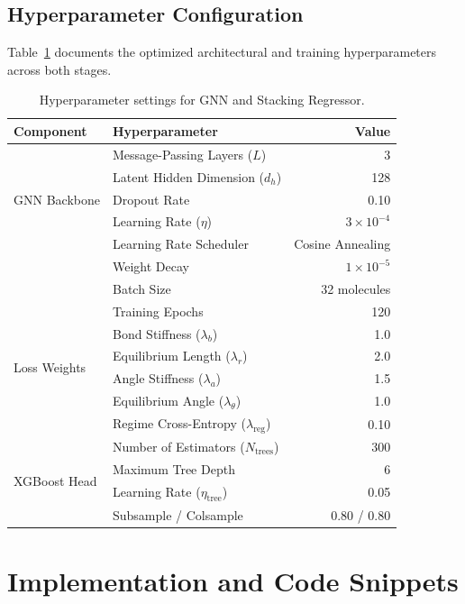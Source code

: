 \documentclass[11pt,a4paper]{article}
\begin{document}
\subsection{Hyperparameter Configuration}
Table~\ref{tab:hyperparams} documents the optimized architectural and training hyperparameters across both stages.

\begin{table}[htbp]
\centering
\caption{Hyperparameter settings for GNN and Stacking Regressor.}
\label{tab:hyperparams}
\begin{tabularx}{0.75\textwidth}{Xlr}
\toprule
\textbf{Component} & \textbf{Hyperparameter} & \textbf{Value} \\
\midrule
\multirow{5}{*}{GNN Backbone} & Message-Passing Layers ($L$) & 3 \\
 & Latent Hidden Dimension ($d_h$) & 128 \\
 & Dropout Rate & 0.10 \\
 & Learning Rate ($\eta$) & $3 \times 10^{-4}$ \\
 & Learning Rate Scheduler & Cosine Annealing \\
 & Weight Decay & $1 \times 10^{-5}$ \\
 & Batch Size & 32 molecules \\
 & Training Epochs & 120 \\
\midrule
\multirow{4}{*}{Loss Weights} & Bond Stiffness ($\lambda_b$) & 1.0 \\
 & Equilibrium Length ($\lambda_r$) & 2.0 \\
 & Angle Stiffness ($\lambda_a$) & 1.5 \\
 & Equilibrium Angle ($\lambda_\theta$) & 1.0 \\
 & Regime Cross-Entropy ($\lambda_{\text{reg}}$) & 0.10 \\
\midrule
\multirow{4}{*}{XGBoost Head} & Number of Estimators ($N_{\text{trees}}$) & 300 \\
 & Maximum Tree Depth & 6 \\
 & Learning Rate ($\eta_{\text{tree}}$) & 0.05 \\
 & Subsample / Colsample & 0.80 / 0.80 \\
\bottomrule
\end{tabularx}
\end{table}

\section{Implementation and Code Snippets}
\label{sec:implementation}
\end{document}
